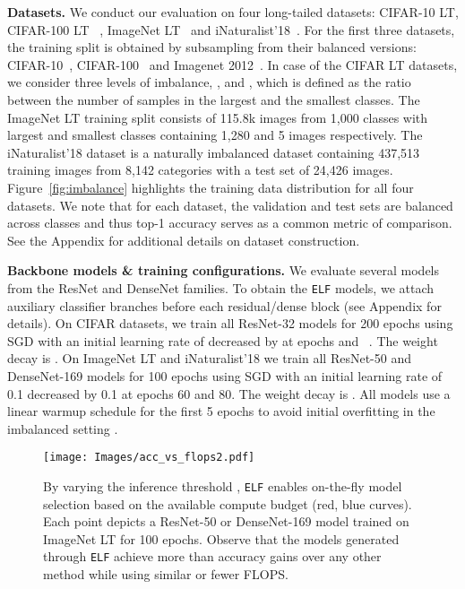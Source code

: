 \documentclass{article}
\newcommand{\method}{\texttt{ELF}\xspace}
\begin{document}
\textbf{Datasets.}
We conduct our evaluation on four long-tailed datasets: CIFAR-10 LT, CIFAR-100 LT ~\cite{cui2019class}, ImageNet LT~\cite{liu2019large} and iNaturalist'18~\cite{van2018inaturalist}. 
For the first three datasets, the training split is obtained by subsampling from their balanced versions: CIFAR-10~\cite{krizhevsky2009learning}, CIFAR-100~\cite{krizhevsky2009learning} and Imagenet 2012~\cite{russakovsky2015imagenet}. 
In case of the CIFAR LT datasets, we consider three levels of imbalance, ,  and , which is defined as the ratio between the number of samples in the largest and the smallest classes. 
The ImageNet LT training split consists of 115.8k images from 1,000 classes with largest and smallest classes containing 1,280 and 5 images respectively. 
The iNaturalist'18 dataset is a naturally imbalanced dataset containing 437,513 training images from 8,142 categories with a test set of 24,426 images. 
Figure~\ref{fig:imbalance} highlights the training data distribution for all four datasets. 
We note that for each dataset, the validation and test sets are balanced across classes and thus top-1 accuracy serves as a common metric of comparison. 
See the Appendix for additional details on dataset construction. 


\textbf{Backbone models \& training configurations.}\label{subsec:architecture}
We evaluate several models from the ResNet and DenseNet families. To obtain the \method{} models, we attach auxiliary classifier branches before each residual/dense block (see Appendix for details). 
On CIFAR datasets, we train all ResNet-32 models for 200 epochs using SGD with an initial learning rate of  decreased by  at epochs  and ~\cite{cao2019learning,cui2019class}. 
The weight decay is . 
On ImageNet LT and iNaturalist'18 we train all ResNet-50 and DenseNet-169 models for 100 epochs using SGD with an initial learning rate of 0.1 decreased by 0.1 at epochs 60 and 80. 
The weight decay is . 
All models use a linear warmup schedule for the first 5 epochs to avoid initial overfitting in the imbalanced setting \cite{cui2019class, cao2019learning}.


\begin{figure}[b]
    \centering
    \texttt{[image: Images/acc\_vs\_flops2.pdf]}
    \caption{By varying the inference threshold , \method{} enables on-the-fly model selection based on the available compute budget (red, blue curves). 
    Each point depicts a ResNet-50 or DenseNet-169 model trained on ImageNet LT for 100 epochs. Observe that the models generated through \method{} achieve more than  accuracy gains over any other method while using similar or fewer FLOPS. 
    }
    \label{fig:inference_ablation}
\end{figure}
\end{document}
